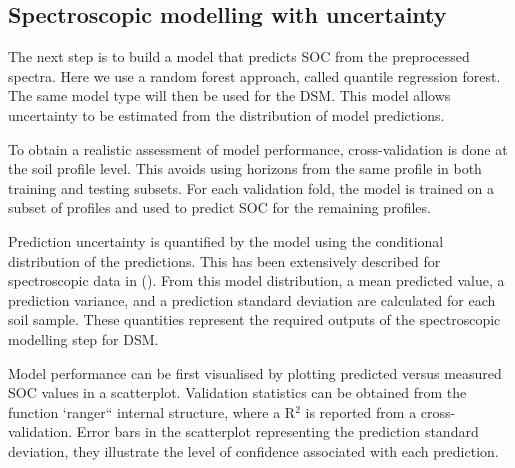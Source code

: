 \documentclass[
  10pt,
  b5paper,
  oneside]{book}
\newenvironment{Shaded}{\begin{snugshade}}{\end{snugshade}}
\newcommand{\AttributeTok}[1]{\textcolor[rgb]{0.13,0.29,0.53}{#1}}
\newcommand{\CommentTok}[1]{\textcolor[rgb]{0.56,0.35,0.01}{\textit{#1}}}
\newcommand{\DecValTok}[1]{\textcolor[rgb]{0.00,0.00,0.81}{#1}}
\newcommand{\FunctionTok}[1]{\textcolor[rgb]{0.13,0.29,0.53}{\textbf{#1}}}
\newcommand{\NormalTok}[1]{#1}
\newcommand{\OtherTok}[1]{\textcolor[rgb]{0.56,0.35,0.01}{#1}}
\newcommand{\SpecialCharTok}[1]{\textcolor[rgb]{0.81,0.36,0.00}{\textbf{#1}}}
\begin{document}
\begin{Shaded}
\end{Shaded}

\subsection{Spectroscopic modelling with uncertainty}\label{spectroscopic-modelling-with-uncertainty}

The next step is to build a model that predicts SOC from the preprocessed spectra. Here we use a random forest approach, called quantile regression forest. The same model type will then be used for the DSM. This model allows uncertainty to be estimated from the distribution of model predictions.

To obtain a realistic assessment of model performance, cross-validation is done at the soil profile level. This avoids using horizons from the same profile in both training and testing subsets. For each validation fold, the model is trained on a subset of profiles and used to predict SOC for the remaining profiles.

Prediction uncertainty is quantified by the model using the conditional distribution of the predictions. This has been extensively described for spectroscopic data in (). From this model distribution, a mean predicted value, a prediction variance, and a prediction standard deviation are calculated for each soil sample. These quantities represent the required outputs of the spectroscopic modelling step for DSM.

Model performance can be first visualised by plotting predicted versus measured SOC values in a scatterplot. Validation statistics can be obtained from the function `ranger`` internal structure, where a R\(^2\) is reported from a cross-validation. Error bars in the scatterplot representing the prediction standard deviation, they illustrate the level of confidence associated with each prediction.
\end{document}
